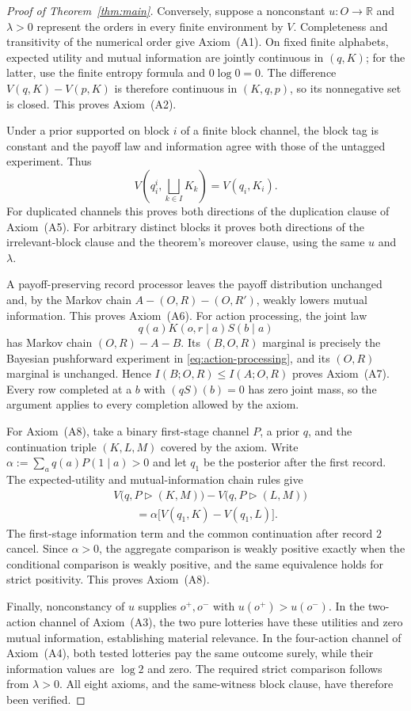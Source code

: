 \documentclass[11pt,a4paper]{article}
\theoremstyle{definition}
\newcommand{\R}{\mathbb R}
\newcommand{\1}{\mathbf 1}
\begin{document}
\begin{proof}[Proof of Theorem~\ref{thm:main}]
Conversely, suppose a nonconstant $u:O\to\R$ and $\lambda>0$ represent
the orders in every finite environment by $V$.
Completeness and transitivity of the numerical order give
Axiom~\textup{(A1)}.  On fixed finite alphabets, expected utility and mutual
information are jointly continuous in $(q,K)$; for the latter, use the finite
entropy formula and $0\log0=0$.  The difference $V(q,K)-V(p,K)$ is therefore continuous in $(K,q,p)$,
so its nonnegative set is closed.  This proves Axiom~\textup{(A2)}.

Under a prior supported on block $i$ of a finite block channel, the block tag
is constant and the payoff law and information agree with those of the
untagged experiment.  Thus
\[
V\left(q_i^i,\bigsqcup_{k\in I}K_k\right)=V(q_i,K_i).
\]
For duplicated channels this proves both directions of the duplication
clause of Axiom~\textup{(A5)}.  For arbitrary distinct blocks it proves
both directions of the irrelevant-block clause and the theorem's moreover
clause, using the same $u$ and $\lambda$.

A payoff-preserving record processor leaves the payoff distribution
unchanged and, by the Markov chain $A-(O,R)-(O,R')$, weakly lowers mutual
information.  This proves Axiom~\textup{(A6)}.
For action processing, the joint law
\[
q(a)K(o,r\mid a)S(b\mid a)
\]
has Markov chain $(O,R)-A-B$.  Its $(B,O,R)$ marginal is precisely the
Bayesian pushforward experiment in \eqref{eq:action-processing}, and its
$(O,R)$ marginal is unchanged.  Hence
$I(B;O,R)\le I(A;O,R)$ proves Axiom~\textup{(A7)}.
Every row completed at a $b$ with $(qS)(b)=0$ has zero joint mass, so the
argument applies to every completion allowed by the axiom.

For Axiom~\textup{(A8)}, take a binary first-stage channel $P$, a prior $q$,
and the continuation triple $(K,L,M)$ covered by the axiom.  Write
$\alpha:=\sum_aq(a)P(1\mid a)>0$ and let $q_1$ be the posterior after the
first record.  The expected-utility and mutual-information chain rules give
\begin{align*}
&V\bigl(q,P\triangleright(K,M)\bigr)
 -V\bigl(q,P\triangleright(L,M)\bigr)\\
&\qquad=\alpha\bigl[V(q_1,K)-V(q_1,L)\bigr].
\end{align*}
The first-stage information term and the common continuation after record
$2$ cancel.  Since $\alpha>0$, the aggregate comparison is weakly positive
exactly when the conditional comparison is weakly positive, and the same
equivalence holds for strict positivity.  This proves Axiom~\textup{(A8)}.

Finally, nonconstancy of $u$ supplies $o^+,o^-$ with $u(o^+)>u(o^-)$.
In the two-action channel of Axiom~\textup{(A3)}, the two pure lotteries have
these utilities and zero mutual information, establishing material
relevance.  In the four-action channel of Axiom~\textup{(A4)}, both tested
lotteries pay the same outcome surely, while their information values are
$\log2$ and zero.  The required strict comparison follows from $\lambda>0$.
All eight axioms, and the same-witness block clause, have therefore been
verified.
\end{proof}
\clearpage
\end{document}
